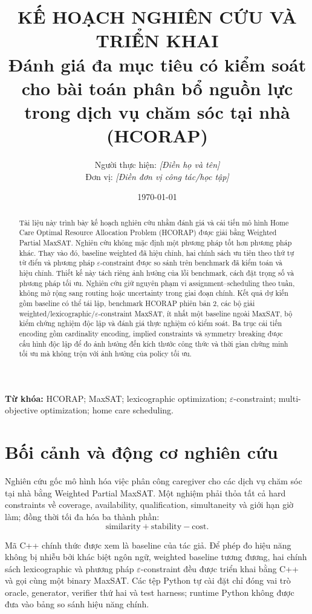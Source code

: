 \documentclass[12pt,a4paper]{article}
\title{%
  \textbf{KẾ HOẠCH NGHIÊN CỨU VÀ TRIỂN KHAI}\\[0.6em]
  \Large Đánh giá đa mục tiêu có kiểm soát cho bài toán phân bổ nguồn lực
  trong dịch vụ chăm sóc tại nhà (HCORAP)
}
\author{Người thực hiện: \textit{[Điền họ và tên]}\\
        Đơn vị: \textit{[Điền đơn vị công tác/học tập]}}
\date{\today}
\begin{document}
\maketitle
\thispagestyle{empty}

\begin{abstract}
Tài liệu này trình bày kế hoạch nghiên cứu nhằm đánh giá và cải tiến mô hình
Home Care Optimal Resource Allocation Problem (HCORAP) được giải bằng
Weighted Partial MaxSAT. Nghiên cứu không mặc định một phương pháp tốt hơn
phương pháp khác. Thay vào đó, baseline weighted đã hiệu chỉnh, hai chính sách
ưu tiên theo thứ tự từ điển và phương pháp
$\varepsilon$-constraint được so sánh trên benchmark đã kiểm toán và hiệu chỉnh.
Thiết kế này tách riêng ảnh hưởng của lỗi benchmark, cách đặt trọng số và phương
pháp tối ưu. Nghiên cứu giữ nguyên phạm vi assignment--scheduling theo tuần,
không mở rộng sang routing hoặc uncertainty trong giai đoạn chính. Kết quả dự
kiến gồm baseline có thể tái lập, benchmark HCORAP phiên bản 2, các bộ giải
weighted/lexicographic/$\varepsilon$-constraint MaxSAT, ít nhất một baseline
ngoài MaxSAT, bộ kiểm chứng nghiệm độc lập và đánh giá thực nghiệm có kiểm soát.
Ba trục cải tiến encoding gồm cardinality encoding, implied constraints và
symmetry breaking được cấu hình độc lập để đo ảnh hưởng đến kích thước công
thức và thời gian chứng minh tối ưu mà không trộn với ảnh hưởng của policy tối ưu.
\end{abstract}

\vfill
\noindent\textbf{Từ khóa:} HCORAP; MaxSAT; lexicographic optimization;
$\varepsilon$-constraint; multi-objective optimization; home care scheduling.

\clearpage
\tableofcontents
\clearpage

\section{Bối cảnh và động cơ nghiên cứu}

Nghiên cứu gốc mô hình hóa việc phân công caregiver cho các dịch vụ chăm sóc
tại nhà bằng Weighted Partial MaxSAT. Một nghiệm phải thỏa tất cả hard
constraints về coverage, availability, qualification, simultaneity và giới hạn
giờ làm; đồng thời tối đa hóa ba thành phần:
\begin{equation}
  \text{similarity}+\text{stability}-\text{cost}.
  \label{eq:original-objective}
\end{equation}

Mã C++ chính thức được xem là baseline của tác giả. Để phép đo hiệu năng không
bị nhiễu bởi khác biệt ngôn ngữ, weighted baseline tương đương, hai chính sách
lexicographic và phương pháp $\varepsilon$-constraint đều được triển khai bằng
C++ và gọi cùng một binary MaxSAT. Các tệp Python tự cài đặt chỉ đóng vai trò
oracle, generator, verifier thứ hai và test harness; runtime Python không được
đưa vào bảng so sánh hiệu năng chính.
\end{document}
